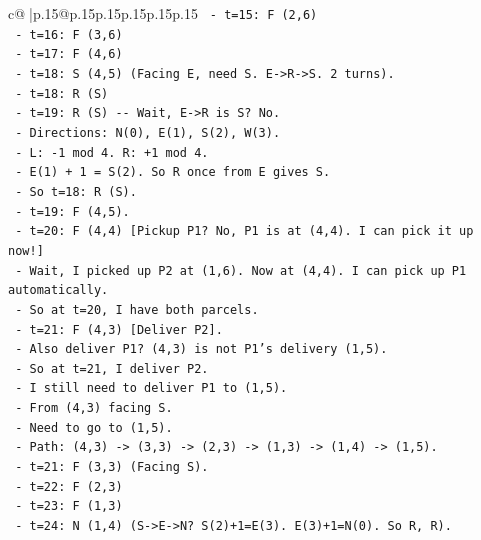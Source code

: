 \documentclass{article}
\begin{document}
{\begin{supertabular}{c@{$\;$}|p{.15\linewidth}@{}p{.15\linewidth}p{.15\linewidth}p{.15\linewidth}p{.15\linewidth}p{.15\linewidth}}
{{{\texttt{                {-} t=15: F (2,6)} \\
\texttt{                {-} t=16: F (3,6)} \\
\texttt{                {-} t=17: F (4,6)} \\
\texttt{                {-} t=18: S (4,5) (Facing E, need S. E{-}>R{-}>S. 2 turns).} \\
\texttt{                  {-} t=18: R (S)} \\
\texttt{                  {-} t=19: R (S) {-}{-} Wait, E{-}>R is S? No.} \\
\texttt{                  {-} Directions: N(0), E(1), S(2), W(3).} \\
\texttt{                  {-} L: {-}1 mod 4. R: +1 mod 4.} \\
\texttt{                  {-} E(1) + 1 = S(2). So R once from E gives S.} \\
\texttt{                  {-} So t=18: R (S).} \\
\texttt{                  {-} t=19: F (4,5).} \\
\texttt{                {-} t=20: F (4,4) {[}Pickup P1? No, P1 is at (4,4). I can pick it up now!{]}} \\
\texttt{                  {-} Wait, I picked up P2 at (1,6). Now at (4,4). I can pick up P1 automatically.} \\
\texttt{                  {-} So at t=20, I have both parcels.} \\
\texttt{                {-} t=21: F (4,3) {[}Deliver P2{]}.} \\
\texttt{                  {-} Also deliver P1? (4,3) is not P1's delivery (1,5).} \\
\texttt{                  {-} So at t=21, I deliver P2.} \\
\texttt{                  {-} I still need to deliver P1 to (1,5).} \\
\texttt{                {-} From (4,3) facing S.} \\
\texttt{                {-} Need to go to (1,5).} \\
\texttt{                {-} Path: (4,3) {-}> (3,3) {-}> (2,3) {-}> (1,3) {-}> (1,4) {-}> (1,5).} \\
\texttt{                {-} t=21: F (3,3) (Facing S).} \\
\texttt{                {-} t=22: F (2,3)} \\
\texttt{                {-} t=23: F (1,3)} \\
\texttt{                {-} t=24: N (1,4) (S{-}>E{-}>N? S(2)+1=E(3). E(3)+1=N(0). So R, R).} \\
}}}
\end{supertabular}}
\end{document}

